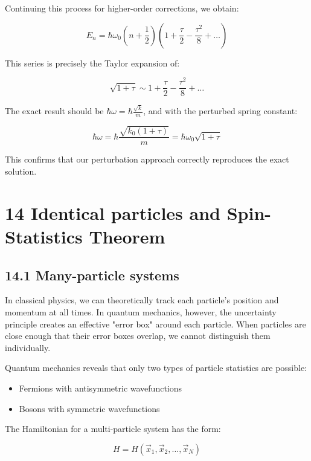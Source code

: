 \documentclass[10pt]{article}
\begin{document}
Continuing this process for higher-order corrections, we obtain:

\begin{equation*}
E_n=\hbar\omega_0(n+\frac{1}{2})(1+\frac{\tau}{2}-\frac{\tau^2}{8}+\ldots) \tag{13.28}
\end{equation*}

This series is precisely the Taylor expansion of:

\begin{equation*}
\sqrt{1+\tau}\sim 1+\frac{\tau}{2}-\frac{\tau^2}{8}+\ldots \tag{13.29}
\end{equation*}

The exact result should be $\hbar\omega=\hbar\frac{\sqrt{k}}{m}$, and with the perturbed spring constant:

\begin{equation*}
\hbar\omega=\hbar\frac{\sqrt{k_0(1+\tau)}}{m}=\hbar\omega_0\sqrt{1+\tau} \tag{13.30}
\end{equation*}

This confirms that our perturbation approach correctly reproduces the exact solution.

\section*{14 Identical particles and Spin-Statistics Theorem}
\subsection*{14.1 Many-particle systems}
In classical physics, we can theoretically track each particle's position and momentum at all times. In quantum mechanics, however, the uncertainty principle creates an effective "error box" around each particle. When particles are close enough that their error boxes overlap, we cannot distinguish them individually.

Quantum mechanics reveals that only two types of particle statistics are possible:
\begin{itemize}
  \item Fermions with antisymmetric wavefunctions
  \item Bosons with symmetric wavefunctions
\end{itemize}

The Hamiltonian for a multi-particle system has the form:

\begin{equation*}
H=H(\vec{x}_1,\vec{x}_2,\ldots,\vec{x}_N) \tag{14.1}
\end{equation*}
\end{document}
